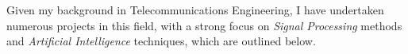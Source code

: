\documentclass[a4paper,11pt]{article}
\newcommand{\resumeHeadingListEnd}{\end{itemize}}
\begin{document}



\vspace{1.5em}
Given my background in Telecommunications Engineering, I have undertaken numerous projects in this field, with a strong focus on \textit{Signal Processing} methods and \textit{Artificial Intelligence} techniques, which are outlined below.
\end{document}
